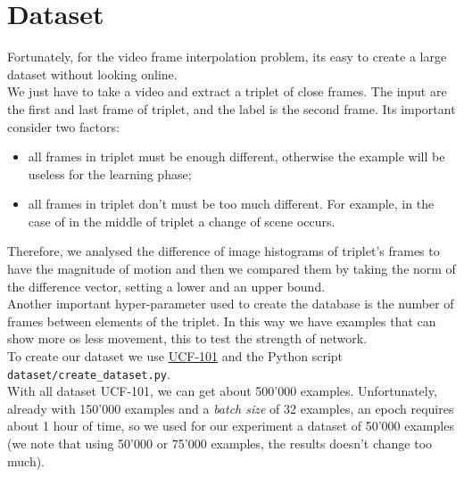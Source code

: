 \documentclass[11pt, a4paper]{article}
\begin{document}
	\section{Dataset}
	Fortunately, for the video frame interpolation problem, its easy to create a large dataset without looking online.\\
	We just have to take a video and extract a triplet of close frames. The input are the first and last frame of triplet, and the label is the second frame. Its important consider two factors:
	\begin{itemize}
		\item all frames in triplet must be enough different, otherwise the example will be useless for the learning phase;
		\item all frames in triplet don't must be too much different. For example, in the case of in the middle of triplet a change of scene occurs. 
	\end{itemize}
	Therefore, we analysed the difference of image histograms of triplet's frames to have the magnitude of motion and then we compared them by taking the norm of the difference vector, setting a lower and an upper bound.\\
	Another important hyper-parameter used to create the database is the number of frames between elements of the triplet. In this way we have examples that can show more os less movement, this to test the strength of network.\\
	To create our dataset we use \href{https://www.crcv.ucf.edu/data/UCF101.php}{UCF-101} and the Python script\\ \texttt{dataset/create\_dataset.py}.\\
	With all dataset UCF-101, we can get about 500'000 examples. Unfortunately, already with 150'000 examples and a \textit{batch size} of 32 examples, an epoch requires about 1 hour of time, so we used for our experiment a dataset of 50'000 examples (we note that using 50'000 or 75'000 examples, the results doesn't change too much).
	 
\end{document}
